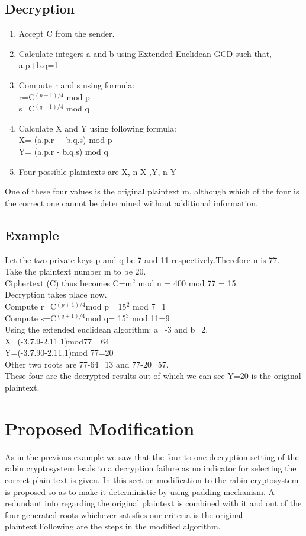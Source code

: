 \documentclass[letterpaper, 12 pt, conference]{ieeeconf}  %
\begin{document}
 

\subsection{Decryption}
\begin{enumerate}
  \item Accept C from the sender.
  \item Calculate integers a and b using Extended Euclidean GCD such that, a.p+b.q=1
  \item Compute r and s using formula:\\r=C$^{(p+1)/4}$ mod p \\s=C$^{(q+1)/4}$ mod q
    \item Calculate X and Y using following formula: \\X= (a.p.r + b.q.s) mod p \\Y= (a.p.r - b.q.s) mod q
    \item Four possible plaintexts are X, n-X ,Y, n-Y
\end{enumerate}

One of these four values is the original plaintext m, although which of the four is the correct one cannot be determined without additional information.

\subsection{Example}
Let the two private keys p and q be 7 and 11 respectively.Therefore n is 77. 
\\Take the plaintext number m to be 20.
\\Ciphertext (C) thus becomes C=m$^2$ mod n = 400 mod 77 = 15.
\\Decryption takes place now.
\\Compute r=C$^{(p+1)/4}$mod p =15$^2$ mod 7=1
\\Compute s=C$^{(q+1)/4}$mod q= 15$^3$ mod 11=9
\\Using the extended euclidean algorithm: a=-3 and b=2.
\\X=(-3.7.9-2.11.1)mod77 =64
\\Y=(-3.7.90-2.11.1)mod 77=20
\\Other two roots are 77-64=13 and 77-20=57.
\\These four are the decrypted results out of which we can see Y=20 is the original plaintext.

\section{Proposed Modification}
As in the previous example we saw that the four-to-one decryption setting of the rabin cryptosystem leads to a decryption failure as no indicator for selecting the correct plain text is given. In this section modification to the rabin cryptosystem is proposed so as to make it deterministic by using padding mechanism. A redundant info regarding the original plaintext is combined with it and out of the four generated roots whichever satisfies our criteria is the original plaintext.Following are the steps in the modified algorithm.
\end{document}
